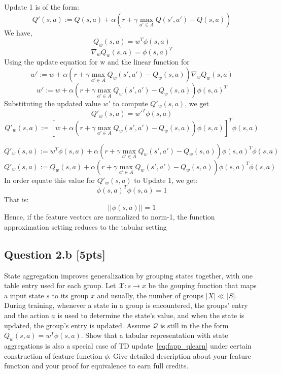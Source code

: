 \documentclass[12pt]{article}
\begin{document}
\noindent
\begin{solution}
Update 1 is of the form:
	$$Q'(s, a) := Q(s, a) + 
		\alpha \left( 
			r + \gamma \max _{a' \in A} Q(s', a') 
				- Q(s, a) 
		\right)$$
We have,
$$Q_{w}(s, a) = w^T \phi(s, a)$$
$$\nabla _w Q_w (s, a)  = \phi(s, a)^T $$
Using the update equation for w and the linear function for 
	$$w' := w + 
		\alpha \left( 
			r + \gamma \max _{a' \in A} Q _w(s', a') 
				- Q _w(s, a) 
		\right) \nabla _w 
			Q _w (s, a)$$
	$$w' := w + 
		\alpha \left( 
			r + \gamma \max _{a' \in A} Q _w(s', a') 
				- Q _w(s, a) 
		\right)\phi(s, a)^T $$
Substituting the updated value $w'$ to compute $Q'_{w}(s, a)$, we get
$$Q'_{w}(s, a) = w'^T\phi(s, a)$$
	$$Q'_{w}(s, a) := \left[w + 
		\alpha \left( 
			r + \gamma \max _{a' \in A} Q _w(s', a') 
				- Q _w(s, a) 
		\right)\phi(s, a)\right]^T\phi(s, a)$$

	$$Q'_{w}(s, a) := w^T\phi(s, a) + 
		\alpha \left( 
			r + \gamma \max _{a' \in A} Q _w(s', a') 
				- Q _w(s, a) 
		\right)\phi(s, a)^T\phi(s, a)$$
	$$Q'_{w}(s, a) := Q_{w}(s, a) + 
		\alpha \left( 
			r + \gamma \max _{a' \in A} Q _w(s', a') 
				- Q _w(s, a) 
		\right)\phi(s, a)^T\phi(s, a)$$
In order equate this value for $Q'_{w}(s, a)$ to Update 1, we get:
$$\phi(s, a)^T\phi(s, a) = 1$$
That is:
$$||\phi(s, a)|| = 1$$
Hence, if the feature vectors are normalized to norm-1, the function approximation setting reduces to the tabular setting
\end{solution}

\pagebreak[4]

\subsection*{Question 2.b \textbf{[5pts]}}
State aggregation improves generalization by grouping states together, with one table entry used for each group. Let $\mathcal{X}: s \to x$ be the gouping function that maps a input state $s$ to its group $x$ and usually, the number of groups $|X| \ll |S|$. During training, whenever a state in a group is encountered, the groups' entry and the action $a$ is used to determine the state's value, and when the state is updated, the group's entry is updated. Assume $\mathcal Q$ is still in the the form $Q _w(s, a) = w ^T \phi(s, a)$. Show that a tabular representation with state aggregations is also a special case of TD update~\ref{eq:fapp_qlearn} under certain construction of feature function $\phi$. Give detailed description about your feature function and your proof for equivalence to earn full credits. 
\end{document}
